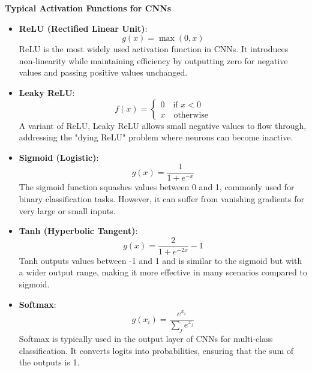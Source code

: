 \textbf{Typical Activation Functions for CNNs}

\begin{itemize}
    \item \textbf{ReLU (Rectified Linear Unit)}: \label{theoretical_activations_relu}
    \begin{equation}
    g(x) = \max(0, x)
    \end{equation}
    ReLU is the most widely used activation function in CNNs. It introduces non-linearity while maintaining efficiency by outputting zero for negative values and passing positive values unchanged.

    \item \textbf{Leaky ReLU}: \label{theoretical_activations_leakyrelu}
    \begin{equation}
        f(x) =
        \begin{cases}
        0 \quad \text{if } x < 0 \\
        x \quad \text{otherwise}
        \end{cases}
    \end{equation}
    A variant of ReLU, Leaky ReLU allows small negative values to flow through, addressing the "dying ReLU" problem where neurons can become inactive.

    \item \textbf{Sigmoid (Logistic)}:  \label{theoretical_activations_sigmoid}
    \begin{equation}
        g(x) = \frac{1}{1 + e^{-x}}
    \end{equation}
    The sigmoid function squashes values between 0 and 1, commonly used for binary classification tasks. However, it can suffer from vanishing gradients for very large or small inputs.

    \item \textbf{Tanh (Hyperbolic Tangent)}:  \label{theoretical_activations_tanh}
    \begin{equation}
    g(x) = \frac{2}{1 + e^{-2x}} - 1
    \end{equation}
    Tanh outputs values between -1 and 1 and is similar to the sigmoid but with a wider output range, making it more effective in many scenarios compared to sigmoid.

    \item \textbf{Softmax}: \label{theoretical_activations_softmax}
    \begin{equation}
    g(x_i) = \frac{e^{x_i}}{\sum_{j} e^{x_j}}
    \end{equation}
    Softmax is typically used in the output layer of CNNs for multi-class classification. It converts logits into probabilities, ensuring that the sum of the outputs is 1.
\end{itemize}

